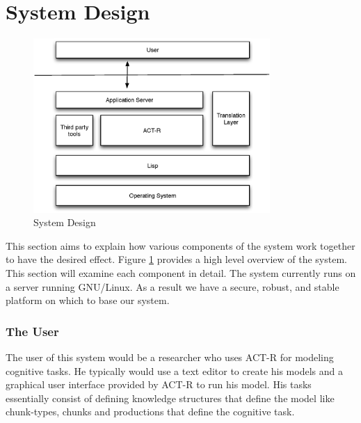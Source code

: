 

\section{System Design}

\begin{figure}[htp]
  \centering
  \includegraphics[width=90mm]{SystemOverview}
  \caption{System Design}
  \label{SysOverview}
\end{figure}

This section aims to explain how various components of the system work
together to have the desired effect. Figure \ref{SysOverview} provides
a high level overview of the system.  This section will examine each
component in detail.  The system currently runs on a server running
GNU\slash Linux.  As a result we have a secure, robust, and stable
platform on which to base our system.


\subsubsection{The User}

The user of this system would be a researcher who uses ACT-R for
modeling cognitive tasks. He typically would use a text editor to
create his models and a graphical user interface provided by ACT-R to
run his model. His tasks essentially consist of defining knowledge
structures that define the model like chunk-types, chunks and
productions that define the cognitive task.

